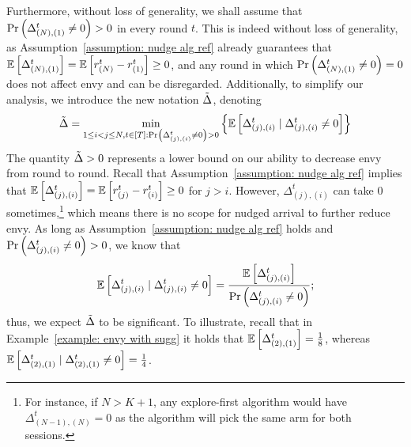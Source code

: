 Furthermore, without loss of generality, we shall assume that $\Pr\left( \Delta^t_{(N),(1)} \neq 0 \right)>0$ in every round $t$. This is indeed without loss of generality, as Assumption~\ref{assumption: nudge alg ref} already guarantees that $\mathbb{E}\left[ \Delta^t_{(N),(1)} \right]=\mathbb{E}\left[ r^t_{(N)}-r^t_{(1)} \right] \geq 0 $, and any round in which $\Pr\left( \Delta^t_{(N),(1)} \neq 0 \right)=0$ does not affect envy and can be disregarded. Additionally, to simplify our analysis, we introduce the new notation $\tilde{\Delta}$, denoting
\begin{equation}\label{eq def tdif}
\tilde\Delta = \min_{1\leq i <j \leq N, t\in [T]:  \Pr\left( \Delta^t_{(j),(i)} \neq 0 \right)>0 }\left\{ \mathbb{E}\left[ \Delta^t_{(j),(i)} \mid \Delta^t_{(j),(i)} \neq 0 \right] \right\}    
\end{equation}
The quantity $\tilde\Delta >0$ %
represents a lower bound on our ability to decrease envy from round to round. Recall that Assumption~\ref{assumption: nudge alg ref} implies that $\mathbb{E}\left[ \Delta^t_{(j),(i)} \right]=\mathbb{E}\left[ r^t_{(j)}-r^t_{(i)} \right] \geq 0 $ for $j>i$. However, $\Delta^t_{(j),(i)}$ can take 0 sometimes,\footnote{For instance, if $N > K+1$, any explore-first algorithm would have $\Delta^t_{(N-1),(N)}=0$ as the algorithm will pick the same arm for both sessions.} which means there is no scope for nudged arrival to further reduce envy. As long as Assumption~\ref{assumption: nudge alg ref} holds and $ \Pr\left( \Delta^t_{(j),(i)} \neq 0 \right)>0$, we know that
\[
\mathbb{E}\left[ \Delta^t_{(j),(i)} \mid \Delta^t_{(j),(i)} \neq 0 \right]=\frac{ \mathbb{E}\left[ \Delta^t_{(j),(i)} \right]}{\Pr\left( \Delta^t_{(j),(i)} \neq 0 \right)};
\] thus, we expect $\tilde\Delta$ to be significant. To illustrate, recall that in Example~\ref{example: envy with sugg} it holds that $\mathbb{E}\left[ \Delta^t_{(2),(1)} \right]=\frac{1}{8}$, whereas $\mathbb{E}\left[ \Delta^t_{(2),(1)} \mid \Delta^t_{(2),(1)} \neq 0 \right]=\frac{1}{4}$.
